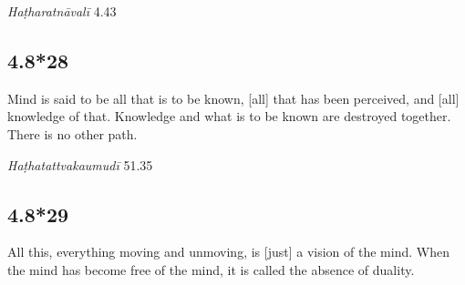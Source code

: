 \begin{ekdosis}
\begin{testimonia}[hp04_008_27]
\emph{Haṭharatnāvalī} 4.43
\begin{versinnote}
\end{versinnote}
\end{testimonia}


\subsection*{4.8*28}
\begin{translation}[hp04_008_28]
Mind is said to be all that is to be known, [all] that has been perceived, and [all] knowledge of that. Knowledge and what is to be known are destroyed together. There is no other path.
\end{translation}


\begin{testimonia}[hp04_008_28]
\emph{Haṭhatattvakaumudī} 51.35
\begin{versinnote}
\end{versinnote}
\end{testimonia}


\subsection*{4.8*29}
\begin{translation}[hp04_008_29]
All this, everything moving and unmoving, is [just] a vision of the mind. When the mind has become free of the mind, it is called the absence of duality.
\end{translation}


\end{ekdosis}
